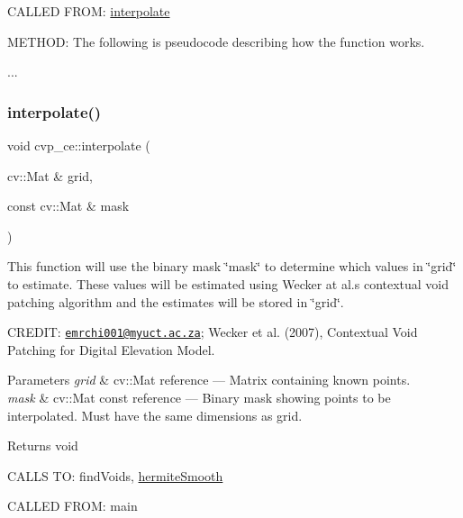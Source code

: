 C\+A\+L\+L\+ED F\+R\+OM\+: \hyperlink{namespacecvp__ce_a2c0695d79d1333faa98819c5d9cb3e4d}{interpolate}

M\+E\+T\+H\+OD\+: The following is pseudocode describing how the function works.
\begin{DoxyEnumerate}
\item ... 
\end{DoxyEnumerate}\mbox{\label{namespacecvp__ce_a2c0695d79d1333faa98819c5d9cb3e4d}} 
\subsubsection{\texorpdfstring{interpolate()}{interpolate()}}
{\footnotesize\ttfamily void cvp\+\_\+ce\+::interpolate (\begin{DoxyParamCaption}\item[{cv\+::\+Mat \&}]{grid,  }\item[{const cv\+::\+Mat \&}]{mask }\end{DoxyParamCaption})}



This function will use the binary mask \char`\"{}mask\char`\"{} to determine which values in \char`\"{}grid\char`\"{} to estimate. These values will be estimated using Wecker at al.\textquotesingle{}s contextual void patching algorithm and the estimates will be stored in \char`\"{}grid\char`\"{}. 

C\+R\+E\+D\+IT\+: \href{mailto:emrchi001@myuct.ac.za}{\tt emrchi001@myuct.\+ac.\+za}; Wecker et al. (2007), Contextual Void Patching for Digital Elevation Model.


\begin{DoxyParams}{Parameters}
{\em grid} & cv\+::\+Mat reference --- Matrix containing known points. \\
\hline
{\em mask} & cv\+::\+Mat const reference --- Binary mask showing points to be interpolated. Must have the same dimensions as grid.\\
\hline
\end{DoxyParams}
\begin{DoxyReturn}{Returns}
void
\end{DoxyReturn}
C\+A\+L\+LS TO\+: find\+Voids, \hyperlink{namespacecvp__ce_a7b4696f21a2858e3715631384bcb627c}{hermite\+Smooth}

C\+A\+L\+L\+ED F\+R\+OM\+: main

